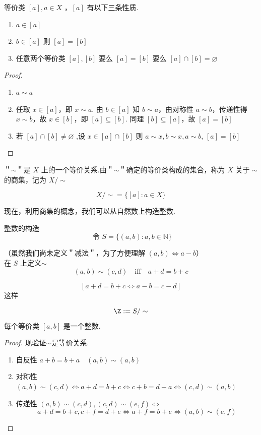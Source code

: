 \begin{lemma}
	等价类 $[a], a \in X$ ，$[a]$ 有以下三条性质.
	\begin{enumerate}
		\item $a \in[a]$
		\item $b \in[a]$ 则 $[a]=[b]$
		\item 任意两个等价类 $[a],[b]$ 要么 $[a]=[b]$ 要么 $[a]\cap[b]=\varnothing$
	\end{enumerate}
\end{lemma}
\begin{proof}
	\begin{enumerate}
		\item $a \sim a$
		\item 任取 $x\in[a]$，即 $x\sim a$. 由 $b\in[a]$ 知 $b\sim a$，由对称性 $a\sim b$，传递性得 $x\sim b$，故 $x\in[b]$，即 $[a]\subseteq[b]$. 同理 $[b]\subseteq[a]$，故 $[a]=[b]$
		\item 若 $[a] \cap[b] \neq \varnothing$ ,设 $x \in[a] \cap[b]$ 则 $a\sim x,b\sim x,a\sim b$, 
		$[a]=[b]$
	\end{enumerate}
\end{proof}
\begin{definition}
	＂$\sim$＂是 $X$ 上的一个等价关系.由＂$\sim$＂确定的等价类构成的集合，称为 $X$ 关于 $\sim$ 的商集，记为 $X / \sim$
	
	$$
	X / \sim=\{[a]: a \in X\}
	$$
\end{definition}
现在，利用商集的概念，我们可以从自然数上构造整数.
\begin{construction}整数的构造
	$$
	\text { 令 } S=\{(a,b): a,b \in \mathbb{N}\}
	$$
	
	（虽然我们尚未定义＂减法＂，为了方便理解 $(a, b)\Leftrightarrow a-b$）\\
	在 $S$ 上定义$\sim$
	\[(a, b) \sim(c, d) \quad\text{iff}\quad a+d=b+c\]	
	
	$$
	[a+d=b+c \Leftrightarrow a-b=c-d]
	$$
	这样
	
	$$
	\Z:=S/\sim
	$$
	每个等价类 $[a, b]$ 是一个整数.
\end{construction}   



\begin{proof}
	现验证$\sim$是等价关系.
	\begin{enumerate}
		\item  自反性 $a+b=b+a \quad(a, b) \sim(a, b)$
		\item 对称性 $(a, b) \sim(c, d) \Leftrightarrow a+d=b+c \Leftrightarrow c+b=d+a \Leftrightarrow (c, d) \sim(a, b)$
		\item 
		传递性 $(a, b) \sim(c, d), ( c, d) \sim(e, f) \Leftrightarrow$
		$$
		a+d=b+c, c+f=d+e \Leftrightarrow a+f=b+e \Leftrightarrow(a, b) \sim(e, f)
		$$
	\end{enumerate}
\end{proof}

